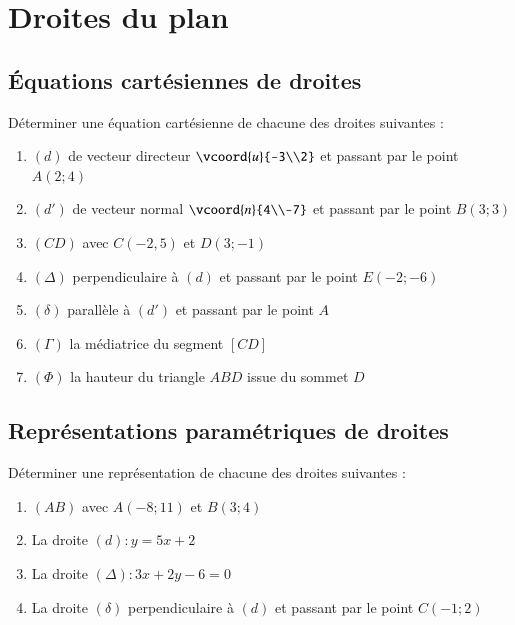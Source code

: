 \documentclass[oneside,12pt]{article}          %
\begin{document}
\section{Droites du plan}

\subsection{Équations cartésiennes de droites}
Déterminer une équation cartésienne de chacune des droites suivantes :
\begin{enumerate}
    \item $(d)$ de vecteur directeur $\vcoord{u}{-3\\2}$ et passant par le point $A(2;4)$
    \item $(d')$ de vecteur normal $\vcoord{n}{4\\-7}$ et passant par le point $B(3;3)$
    \item $(CD)$ avec $C(-2,5)$ et $D(3;-1)$
    \item $(\Delta)$ perpendiculaire à $(d)$ et passant par le point $E(-2;-6)$
    \item $(\delta)$ parallèle à $(d')$ et passant par le point $A$
    \item $(\Gamma)$ la médiatrice du segment $[CD]$
    \item $(\Phi)$ la hauteur du triangle $ABD$ issue du sommet $D$
\end{enumerate}



\subsection{Représentations paramétriques de droites}
Déterminer une représentation de chacune des droites suivantes :
\begin{enumerate}
	\item $(AB)$ avec $A(-8;11)$ et $B(3;4)$
	\item La droite $(d):y=5x+2$
	\item La droite $(\Delta):3x+2y-6=0$
	\item La droite $(\delta)$ perpendiculaire à $(d)$ et passant par le point $C(-1;2)$
\end{enumerate}
\end{document}
